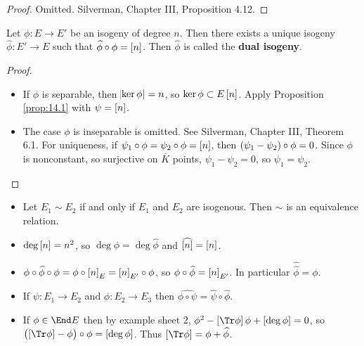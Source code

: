 \begin{proof}
Omitted. Silverman, Chapter III, Proposition 4.12.
\end{proof}

\begin{proposition}
Let $ \phi : E \to E' $ be an isogeny of degree $ n $. Then there exists a unique isogeny $ \widehat{\phi} : E' \to E $ such that $ \widehat{\phi} \circ \phi = \sbr{n} $. Then $ \widehat{\phi} $ is called the \textbf{dual isogeny}.
\end{proposition}

\begin{proof}
\hfill
\begin{itemize}
\item If $ \phi $ is separable, then $ \abs{\ker \phi} = n $, so $ \ker \phi \subset E\sbr{n} $. Apply Proposition \ref{prop:14.1} with $ \psi = \sbr{n} $.
\item The case $ \phi $ is inseparable is omitted. See Silverman, Chapter III, Theorem 6.1. For uniqueness, if $ \psi_1 \circ \phi = \psi_2 \circ \phi = \sbr{n} $, then $ \br{\psi_1 - \psi_2} \circ \phi = 0 $. Since $ \phi $ is nonconstant, so surjective on $ \overline{K} $ points, $ \psi_1 - \psi_2 = 0 $, so $ \psi_1 = \psi_2 $.
\end{itemize}
\end{proof}

\begin{remark*}
\hfill
\begin{itemize}
\item Let $ E_1 \sim E_2 $ if and only if $ E_1 $ and $ E_2 $ are isogenous. Then $ \sim $ is an equivalence relation.
\item $ \deg \sbr{n} = n^2 $, so $ \deg \phi = \deg \widehat{\phi} $ and $ \widehat{\sbr{n}} = \sbr{n} $.
\item $ \phi \circ \widehat{\phi} \circ \phi = \phi \circ \sbr{n}_E = \sbr{n}_{E'} \circ \phi $, so $ \phi \circ \widehat{\phi} = \sbr{n}_{E'} $. In particular $ \widehat{\widehat{\phi}} = \phi $.
\item If $ \psi : E_1 \to E_2 $ and $ \phi : E_2 \to E_3 $ then $ \widehat{\phi \circ \psi} = \widehat{\psi} \circ \widehat{\phi} $.
\item If $ \phi \in \End E $ then by example sheet $ 2 $, $ \phi^2 - \sbr{\Tr \phi}\phi + \sbr{\deg \phi} = 0 $, so $ \br{\sbr{\Tr \phi} - \phi} \circ \phi = \sbr{\deg \phi} $. Thus $ \sbr{\Tr \phi} = \phi + \widehat{\phi} $.
\end{itemize}
\end{remark*}

